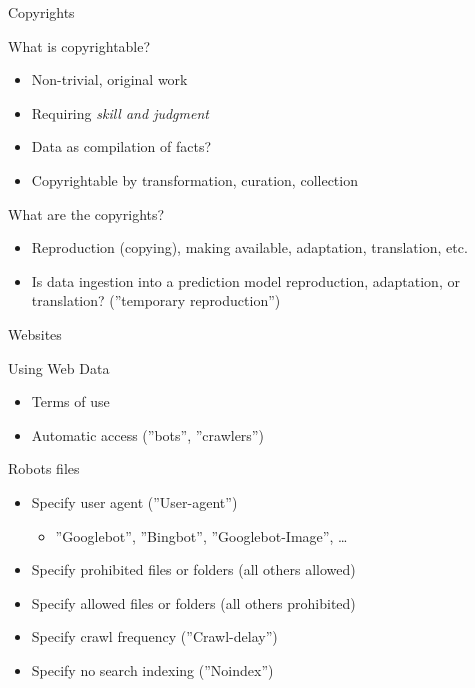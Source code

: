 \documentclass[ignorenonframetext,xcolor=x11names]{beamer}
\begin{document}
\begin{frame}{Copyrights}
  \begin{block}{What is copyrightable?}
  \begin{itemize}
     \item Non-trivial, original work
     \item Requiring \emph{skill and judgment}
     \item Data as compilation of facts?
     \item Copyrightable by transformation, curation, collection 
     \end{itemize}
  \end{block}
  \begin{block}{What are the copyrights?}
  \begin{itemize}
     \item Reproduction (copying), making available, adaptation, translation, etc.
     \item Is data ingestion into a prediction model reproduction, adaptation, or translation? (''temporary reproduction'')
  \end{itemize}
  \end{block}
\end{frame}

\begin{frame}{Websites}
  \begin{block}{Using Web Data}
  \begin{itemize}
     \item Terms of use 
     \item Automatic access (''bots'', ''crawlers'')
  \end{itemize}
  \end{block}
  \begin{block}{Robots files}
     \begin{itemize}
       \item Specify user agent (''User-agent'')
       \begin{itemize}
          \item ''Googlebot'', ''Bingbot'', ''Googlebot-Image'', \ldots
       \end{itemize}
       \item Specify prohibited files or folders (all others allowed)
       \item Specify allowed files or folders (all others prohibited)
       \item Specify crawl frequency (''Crawl-delay'')
       \item Specify no search indexing (''Noindex'')
     \end{itemize}
  \end{block}
\end{frame}
\end{document}
